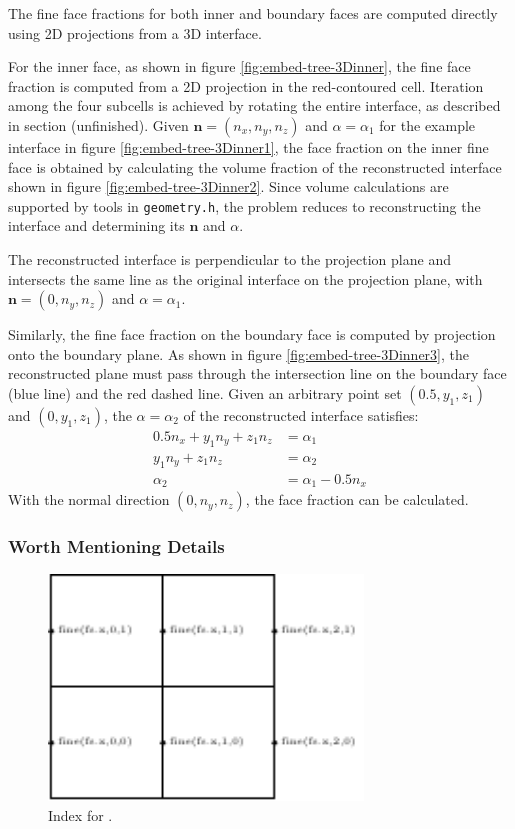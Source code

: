 The fine face fractions for both inner and boundary faces are computed directly using 2D projections from a 3D interface.

For the inner face, as shown in figure \ref{fig:embed-tree-3Dinner}, the fine face fraction is computed from a 2D projection in the red-contoured cell. Iteration among the four subcells is achieved by rotating the entire interface, as described in section (unfinished). Given $\mathbf{n} = (n_x, n_y, n_z)$ and $\alpha = \alpha_1$ for the example interface in figure \ref{fig:embed-tree-3Dinner1}, the face fraction on the inner fine face is obtained by calculating the volume fraction of the reconstructed interface shown in figure \ref{fig:embed-tree-3Dinner2}. Since volume calculations are supported by tools in \texttt{geometry.h}, the problem reduces to reconstructing the interface and determining its $\mathbf{n}$ and $\alpha$.

The reconstructed interface is perpendicular to the projection plane and intersects the same line as the original interface on the projection plane, with $\mathbf{n} = (0, n_y, n_z)$ and $\alpha = \alpha_1$.

Similarly, the fine face fraction on the boundary face is computed by projection onto the boundary plane. As shown in figure \ref{fig:embed-tree-3Dinner3}, the reconstructed plane must pass through the intersection line on the boundary face (blue line) and the red dashed line. Given an arbitrary point set $(0.5, y_1, z_1)$ and $(0, y_1, z_1)$, the $\alpha = \alpha_2$ of the reconstructed interface satisfies:
\begin{align}
    0.5 n_x + y_1 n_y + z_1 n_z &= \alpha_1\\
    y_1 n_y + z_1 n_z &= \alpha_2\\
    \alpha_2 &= \alpha_1 - 0.5 n_x \label{equ:embed-tree-alphabf}
\end{align}
With the normal direction $(0, n_y, n_z)$, the face fraction can be calculated.

\subsubsection{Worth Mentioning Details}
\begin{figure}[ht]
    \centering
    \includegraphics[height=6cm]{./image/embed-tree-h/fine.pdf}
    \caption{Index for .}
    \label{fig:embed-tree-finefunc}
\end{figure}

